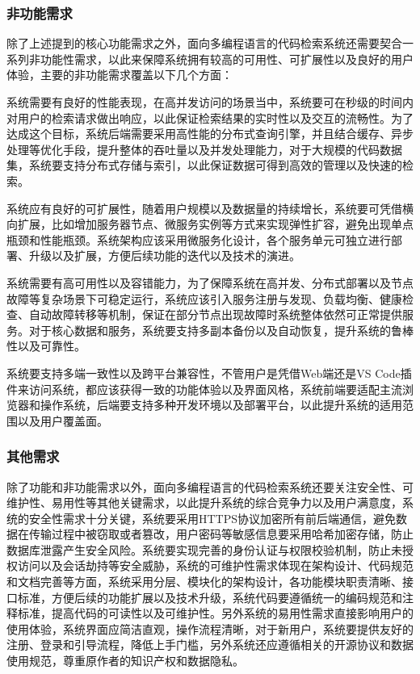 \documentclass[UTF8,a4paper,12pt]{ctexart}
\numberwithin{equation}{section}
\begin{document}
\subsubsection{非功能需求}
除了上述提到的核心功能需求之外，面向多编程语言的代码检索系统还需要契合一系列非功能性需求，以此来保障系统拥有较高的可用性、可扩展性以及良好的用户体验，主要的非功能需求覆盖以下几个方面：\par
系统需要有良好的性能表现，在高并发访问的场景当中，系统要可在秒级的时间内对用户的检索请求做出响应，以此保证检索结果的实时性以及交互的流畅性。为了达成这个目标，系统后端需要采用高性能的分布式查询引擎，并且结合缓存、异步处理等优化手段，提升整体的吞吐量以及并发处理能力，对于大规模的代码数据集，系统要支持分布式存储与索引，以此保证数据可得到高效的管理以及快速的检索。\par
系统应有良好的可扩展性，随着用户规模以及数据量的持续增长，系统要可凭借横向扩展，比如增加服务器节点、微服务实例等方式来实现弹性扩容，避免出现单点瓶颈和性能瓶颈。系统架构应该采用微服务化设计，各个服务单元可独立进行部署、升级以及扩展，方便后续功能的迭代以及技术的演进。\par
系统需要有高可用性以及容错能力，为了保障系统在高并发、分布式部署以及节点故障等复杂场景下可稳定运行，系统应该引入服务注册与发现、负载均衡、健康检查、自动故障转移等机制，保证在部分节点出现故障时系统整体依然可正常提供服务。对于核心数据和服务，系统要支持多副本备份以及自动恢复，提升系统的鲁棒性以及可靠性。\par
系统要支持多端一致性以及跨平台兼容性，不管用户是凭借Web端还是VS Code插件来访问系统，都应该获得一致的功能体验以及界面风格，系统前端要适配主流浏览器和操作系统，后端要支持多种开发环境以及部署平台，以此提升系统的适用范围以及用户覆盖面。\par


\subsubsection{其他需求}
除了功能和非功能需求以外，面向多编程语言的代码检索系统还要关注安全性、可维护性、易用性等其他关键需求，以此提升系统的综合竞争力以及用户满意度，系统的安全性需求十分关键，系统要采用HTTPS协议加密所有前后端通信，避免数据在传输过程中被窃取或者篡改，用户密码等敏感信息要采用哈希加密存储，防止数据库泄露产生安全风险。系统要实现完善的身份认证与权限校验机制，防止未授权访问以及会话劫持等安全威胁，系统的可维护性需求体现在架构设计、代码规范和文档完善等方面，系统采用分层、模块化的架构设计，各功能模块职责清晰、接口标准，方便后续的功能扩展以及技术升级，系统代码要遵循统一的编码规范和注释标准，提高代码的可读性以及可维护性。另外系统的易用性需求直接影响用户的使用体验，系统界面应简洁直观，操作流程清晰，对于新用户，系统要提供友好的注册、登录和引导流程，降低上手门槛，另外系统还应遵循相关的开源协议和数据使用规范，尊重原作者的知识产权和数据隐私。\par
\end{document}
